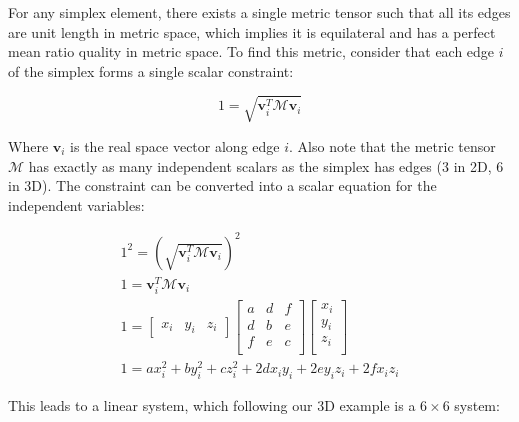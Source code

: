 For any simplex element, there exists a single metric tensor
such that all its edges are unit length in metric space, which
implies it is equilateral and has a perfect mean ratio quality
in metric space.
To find this metric, consider that each edge $i$ of the simplex
forms a single scalar constraint:

\begin{equation}
1 = \sqrt{\mathbf{v}_i^T \mathcal{M} \mathbf{v}_i}
\end{equation}

Where $\mathbf{v}_i$ is the real space vector along edge $i$.
Also note that the metric tensor $\mathcal{M}$ has exactly as
many independent scalars as the simplex has edges
($3$ in 2D, $6$ in 3D).
The constraint can be converted into a scalar equation
for the independent variables:

\begin{gather*}
1^2 = \left(\sqrt{\mathbf{v}_i^T \mathcal{M} \mathbf{v}_i}\right)^2 \\
1 = \mathbf{v}_i^T \mathcal{M} \mathbf{v}_i \\
1 = \begin{bmatrix} x_i & y_i & z_i \end{bmatrix}
\begin{bmatrix}
a & d & f \\
d & b & e \\
f & e & c \\
\end{bmatrix}
\begin{bmatrix}
x_i \\
y_i \\
z_i \\
\end{bmatrix} \\
1 = ax_i^2 + by_i^2 + cz_i^2 + 2dx_iy_i + 2ey_iz_i + 2fx_iz_i
\end{gather*}

This leads to a linear system, which following our 3D example
is a $6\times 6$ system:


